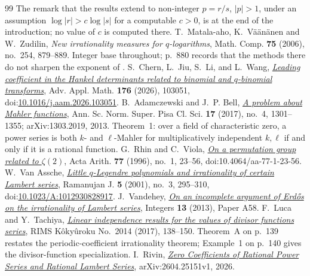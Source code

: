 \documentclass[11pt]{article}
\begin{document}
\begin{thebibliography}{99}
  The remark that the results extend to non-integer \(p=r/s\), \(|p|>1\), under
  an assumption \(\log|r|>c\log|s|\) for a computable \(c>0\), is at the end of
  the introduction; no value of \(c\) is computed there.
 T.~Matala-aho, K.~V\"a\"an\"anen and W.~Zudilin,
  \emph{New irrationality measures for $q$-logarithms},
  Math. Comp. \textbf{75} (2006), no.~254, 879--889.  Integer base throughout;
  p.~880 records that the methods there do not sharpen the exponent of
  \cite{zudilin2004}.
 S.~Chern, L.~Jiu, S.~Li, and L.~Wang,
  \href{https://arxiv.org/abs/2401.17220}{\emph{Leading coefficient in the
  Hankel determinants related to binomial and $q$-binomial transforms}},
  Adv. Appl. Math. \textbf{176} (2026), 103051,
  doi:\href{https://doi.org/10.1016/j.aam.2026.103051}{10.1016/j.aam.2026.103051}.
 B.~Adamczewski and J.~P. Bell,
  \href{https://arxiv.org/abs/1303.2019}{\emph{A problem about Mahler
  functions}}, Ann. Sc. Norm. Super. Pisa Cl. Sci. \textbf{17} (2017), no.~4,
  1301--1355; arXiv:1303.2019, 2013.  Theorem~1: over a field of characteristic
  zero, a power series is both \(k\)- and \(\ell\)-Mahler for multiplicatively
  independent \(k,\ell\) if and only if it is a rational function.
 G.~Rhin and C.~Viola,
  \href{https://geodesic.mathdoc.fr/articles/10.4064/aa-77-1-23-56/}
  {\emph{On a permutation group related to $\zeta(2)$}},
  Acta Arith. \textbf{77} (1996), no.~1, 23--56,
  doi:10.4064/aa-77-1-23-56.
 W.~Van Assche,
  \href{https://arxiv.org/abs/math/0101187}{\emph{Little \(q\)-Legendre
  polynomials and irrationality of certain Lambert series}},
  Ramanujan J. \textbf{5} (2001), no.~3, 295--310,
  doi:\href{https://doi.org/10.1023/A:1012930828917}{10.1023/A:1012930828917}.
 J.~Vandehey,
  \href{https://arxiv.org/abs/1206.0340}{\emph{On an incomplete argument of
  Erd\H{o}s on the irrationality of Lambert series}},
  Integers \textbf{13} (2013), Paper A58.
 F.~Luca and Y.~Tachiya,
  \href{https://www.kurims.kyoto-u.ac.jp/~kyodo/kokyuroku/contents/pdf/2014-14.pdf}
  {\emph{Linear independence results for the values of divisor functions
  series}}, RIMS K\^oky\^uroku No.~2014 (2017), 138--150.
  Theorem~A on p.~139 restates the periodic-coefficient irrationality theorem;
  Example~1 on p.~140 gives the divisor-function specialization.
 I.~Rivin,
\href{https://arxiv.org/abs/2604.25151}{\emph{Zero Coefficients of Rational
  Power Series and Rational Lambert Series}}, arXiv:2604.25151v1, 2026.

\end{thebibliography}
\end{document}
